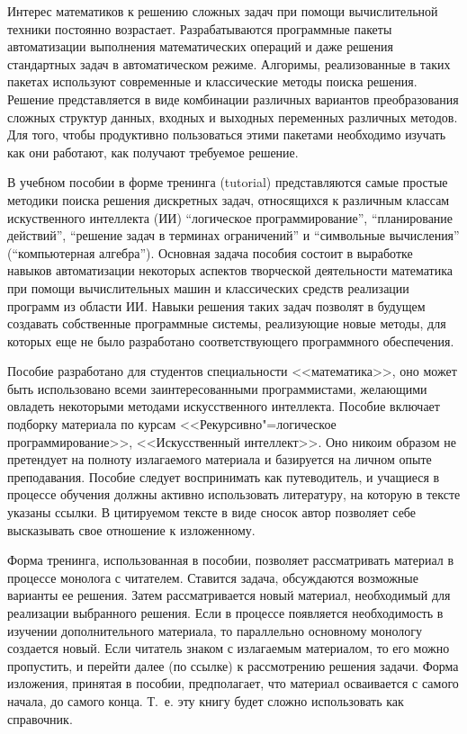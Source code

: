 \documentclass[a4paper,14pt, openany, twoside, draft]{extbook} %
\newcommand{\nnn}[2][ncolor]{\noindent%
\textcolor{eclr}{!\ [}\textcolor{#1}{#2}\textcolor{eclr}{]}}
\begin{document}


Интерес математиков к решению сложных задач при помощи вычислительной техники постоянно возрастает.  Разрабатываются программные пакеты автоматизации выполнения математических операций и даже решения стандартных задач в автоматическом режиме.  Алгоримы, реализованные в таких пакетах используют современные и классические методы поиска решения.  Решение представляется в виде комбинации различных вариантов преобразования сложных структур данных, входных и выходных переменных различных методов.  Для того, чтобы продуктивно пользоваться этими пакетами необходимо изучать как они работают, как получают требуемое решение.

В учебном пособии в форме тренинга (tutorial) представляются самые простые методики поиска решения дискретных задач, относящихся к различным классам искуственного интеллекта (ИИ) ``логическое программирование'', ``планирование действий'', ``решение задач в терминах ограничений'' и ``символьные вычисления'' (``компьютерная алгебра'').  Основная задача пособия состоит в выработке навыков автоматизации некоторых аспектов творческой деятельности математика при помощи вычислительных машин и классических средств реализации программ из области ИИ.  Навыки решения таких задач позволят в будущем создавать собственные программные системы, реализующие новые методы, для которых еще не было разработано соответствующего программного обеспечения.

Пособие разработано для студентов специальности <<математика>>, оно может быть использовано всеми заинтересованными программистами, желающими овладеть некоторыми методами искусственного интеллекта. Пособие включает подборку материала по курсам <<Рекурсивно"=логическое программирование>>, <<Искусственный интеллект>>. Оно никоим образом не претендует на полноту излагаемого материала и базируется на личном опыте преподавания. Пособие следует воспринимать как путеводитель, и учащиеся в процессе обучения должны активно использовать литературу, на которую в тексте указаны ссылки. В цитируемом тексте в виде сносок автор позволяет себе высказывать свое отношение к изложенному.

Форма тренинга, использованная в пособии, позволяет рассматривать материал в процессе монолога с читателем.  Ставится задача, обсуждаются возможные варианты ее решения.  Затем рассматривается новый материал, необходимый для реализации выбранного решения.  Если в процессе появляется необходимость в изучении дополнительного материала, то параллельно основному монологу создается новый.  Если читатель знаком с излагаемым материалом, то его можно пропустить, и перейти далее (по ссылке) к рассмотрению решения задачи.  Форма изложения, принятая в пособии, предполагает, что материал осваивается с самого начала, до самого конца.  Т.~е. эту книгу будет сложно использовать как справочник.
\end{document}
